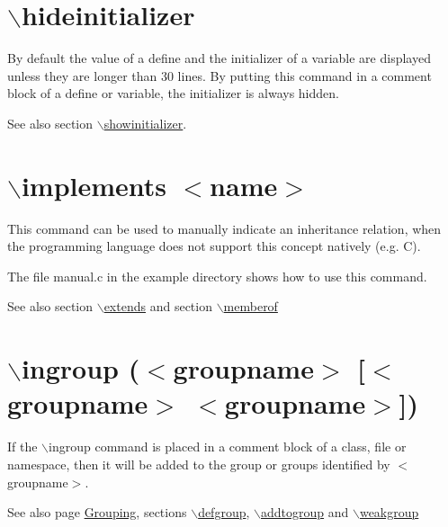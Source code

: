  \hypertarget{commands_cmdhideinitializer}{}\section{$\backslash$hideinitializer}\label{commands_cmdhideinitializer}
 By default the value of a define and the initializer of a variable are displayed unless they are longer than 30 lines. By putting this command in a comment block of a define or variable, the initializer is always hidden.

\begin{DoxySeeAlso}{See also}
section \hyperlink{commands_cmdshowinitializer}{$\backslash$showinitializer}.
\end{DoxySeeAlso}


 \hypertarget{commands_cmdimplements}{}\section{$\backslash$implements $<$name$>$}\label{commands_cmdimplements}
 This command can be used to manually indicate an inheritance relation, when the programming language does not support this concept natively (e.g. C).

The file {\ttfamily manual.c} in the example directory shows how to use this command.



\begin{DoxySeeAlso}{See also}
section \hyperlink{commands_cmdextends}{$\backslash$extends} and section \hyperlink{commands_cmdmemberof}{$\backslash$memberof}
\end{DoxySeeAlso}


 \hypertarget{commands_cmdingroup}{}\section{$\backslash$ingroup ($<$groupname$>$ \mbox{[}$<$groupname$>$ $<$groupname$>$\mbox{]})}\label{commands_cmdingroup}
 If the $\backslash$ingroup command is placed in a comment block of a class, file or namespace, then it will be added to the group or groups identified by $<$groupname$>$.

\begin{DoxySeeAlso}{See also}
page \hyperlink{grouping}{Grouping}, sections \hyperlink{commands_cmddefgroup}{$\backslash$defgroup}, \hyperlink{commands_cmdaddtogroup}{$\backslash$addtogroup} and \hyperlink{commands_cmdweakgroup}{$\backslash$weakgroup}
\end{DoxySeeAlso}


